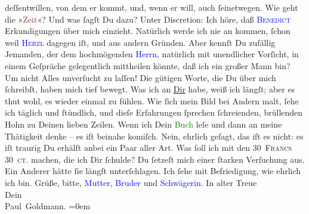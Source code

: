                deſſentwillen, von dem er kommt, und, wenn er will, auch ſeinetwegen.\pend
           \pstart
           Wie geht die »\textcolor{brown}{Zeit}{}\ledrightnote{\textcolor{brown}{Die Zeit. Wiener Wochenschrift}}«? Und was ſagſt Du dazu?\pend
           \pstart
           Unter Discretion: Ich höre, daß \textsc{\textcolor{blue}{Benedict}{}\ledrightnote{\textcolor{blue}{Moriz Benedikt}}} Erkundigungen über mich einzieht. Natürlich werde ich nie
               an \label{K_L02622-4v}\label{K_L02622-4h}
               kommen, ſchon weil \textsc{\textcolor{blue}{Herzl}{}\ledrightnote{\textcolor{blue}{Theodor Herzl}}} dagegen iſt, und aus andern Gründen. Aber kennſt Du zufällig
               Jemanden, der dem hochmögenden \textcolor{blue}{Herrn}{}\ledrightnote{\textcolor{blue}{Moriz Benedikt}}, natürlich
               mit unendlicher Vorſicht, in einem Geſpräche gelegentlich mittheilen könnte, {\pb}daß ich ein großer Mann bin? Um nicht Alles
               unverſucht zu laſſen!\pend
           \pstart
           Die gütigen Worte, die Du über mich ſchreibſt, haben mich tief bewegt. Was ich an \uline{Dir} habe, weiß ich längſt; aber es thut wohl, es
               wieder einmal zu fühlen. Wie ſich mein Bild bei Andern malt, ſehe ich täglich und
               ſtündlich, und dieſe Erfahrungen ſprechen ſchreienden, brüllenden Hohn zu Deinen
               lieben Zeilen. Wenn ich  Dein \textcolor{green}{Buch}{} leſe und dann an meine Thätigkeit denke –
                  {\pb}es iſt beinahe komiſch. Nein, ehrlich geſagt,
               das iſt es nicht: es iſt traurig{\dotsfour}\pend
           \pstart
           Du erhälſt anbei ein Paar \label{K_L02622-11v}\label{K_L02622-11h}
               aller Art.\pend
           \pstart
           Was ſoll ich mit den \textsc{30 Francs 30 ct.} machen, die
               ich Dir ſchulde? Du ſetzeſt mich einer ſtarken Verſuchung aus. Ein Anderer hätte ſie
               längſt unterſchlagen. Ich ſehe mit Befriedigung, wie  ehrlich ich bin.\pend
           \pstart
           Grüße, bitte, \textcolor{blue}{Mutter}{}, \textcolor{blue}{Bruder}{} und \textcolor{blue}{Schwägerin}{}.\pend
           \pstart
           In alter Treue{\\[\baselineskip]}Dein{\\[\baselineskip]}\spacefill\mbox{Paul Goldmann.}\pend
           \leftskip=0em{}\endnumbering{}\begin{anhang}\end{anhang}
      